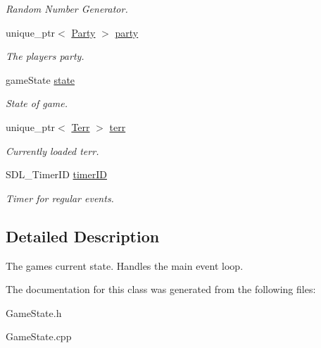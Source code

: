 \begin{DoxyCompactItemize}
\begin{DoxyCompactList}\small\item\em Random Number Generator. \end{DoxyCompactList}\item 
unique\+\_\+ptr$<$ \hyperlink{class_party}{Party} $>$ \hyperlink{class_game_state_a90d33253ae1bf970ec7f89b2f3975048}{party}\hypertarget{class_game_state_a90d33253ae1bf970ec7f89b2f3975048}{}\label{class_game_state_a90d33253ae1bf970ec7f89b2f3975048}

\begin{DoxyCompactList}\small\item\em The player\textquotesingle{}s party. \end{DoxyCompactList}\item 
game\+State \hyperlink{class_game_state_a90969808e5db25eb4f0ae6b7be027c65}{state}\hypertarget{class_game_state_a90969808e5db25eb4f0ae6b7be027c65}{}\label{class_game_state_a90969808e5db25eb4f0ae6b7be027c65}

\begin{DoxyCompactList}\small\item\em State of game. \end{DoxyCompactList}\item 
unique\+\_\+ptr$<$ \hyperlink{class_terr}{Terr} $>$ \hyperlink{class_game_state_ae2450c36c6b73d979978b22523f3521c}{terr}\hypertarget{class_game_state_ae2450c36c6b73d979978b22523f3521c}{}\label{class_game_state_ae2450c36c6b73d979978b22523f3521c}

\begin{DoxyCompactList}\small\item\em Currently loaded terr. \end{DoxyCompactList}\item 
S\+D\+L\+\_\+\+Timer\+ID \hyperlink{class_game_state_a69d14a618108634864b0b547a5e1b5c5}{timer\+ID}\hypertarget{class_game_state_a69d14a618108634864b0b547a5e1b5c5}{}\label{class_game_state_a69d14a618108634864b0b547a5e1b5c5}

\begin{DoxyCompactList}\small\item\em Timer for regular events. \end{DoxyCompactList}\end{DoxyCompactItemize}


\subsection{Detailed Description}
The game\textquotesingle{}s current state. Handles the main event loop. 

The documentation for this class was generated from the following files\+:\begin{DoxyCompactItemize}
\item 
Game\+State.\+h\item 
Game\+State.\+cpp\end{DoxyCompactItemize}
